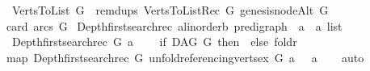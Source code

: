 \begin{isabellebody}
\ \ \ {\isachardoublequoteopen}Verts{\isacharunderscore}{\kern0pt}To{\isacharunderscore}{\kern0pt}List\ G\ {\isacharequal}{\kern0pt}\ remdups\ {\isacharparenleft}{\kern0pt}Verts{\isacharunderscore}{\kern0pt}To{\isacharunderscore}{\kern0pt}List{\isacharunderscore}{\kern0pt}Rec\ G\ {\isacharbrackleft}{\kern0pt}genesis{\isacharunderscore}{\kern0pt}nodeAlt\ G{\isacharbrackright}{\kern0pt}\ \isanewline
\ \ {\isacharparenleft}{\kern0pt}card\ {\isacharparenleft}{\kern0pt}arcs\ G{\isacharparenright}{\kern0pt}{\isacharparenright}{\kern0pt}{\isacharparenright}{\kern0pt}{\isachardoublequoteclose}\isanewline
\isanewline
{}\isamarkupfalse%
\ Depth{\isacharunderscore}{\kern0pt}first{\isacharunderscore}{\kern0pt}search{\isacharunderscore}{\kern0pt}rec{\isacharcolon}{\kern0pt}{\isacharcolon}{\kern0pt}\ {\isachardoublequoteopen}{\isacharparenleft}{\kern0pt}{\isacharprime}{\kern0pt}a{\isacharcolon}{\kern0pt}{\isacharcolon}{\kern0pt}linorder{\isacharcomma}{\kern0pt}{\isacharprime}{\kern0pt}b{\isacharparenright}{\kern0pt}\ pre{\isacharunderscore}{\kern0pt}digraph\ {\isasymRightarrow}\ {\isacharprime}{\kern0pt}a\ {\isasymRightarrow}\ {\isacharprime}{\kern0pt}a\ list{\isachardoublequoteclose}\isanewline
\ \ \ {\isachardoublequoteopen}Depth{\isacharunderscore}{\kern0pt}first{\isacharunderscore}{\kern0pt}search{\isacharunderscore}{\kern0pt}rec\ G\ a\ \ {\isacharequal}{\kern0pt}\ \isanewline
\ {\isacharparenleft}{\kern0pt}if{\isacharparenleft}{\kern0pt}{\isasymnot}\ DAG\ G{\isacharparenright}{\kern0pt}\ then\ {\isacharbrackleft}{\kern0pt}{\isacharbrackright}{\kern0pt}\ else\ {\isacharparenleft}{\kern0pt}foldr\ {\isacharparenleft}{\kern0pt}{\isacharat}{\kern0pt}{\isacharparenright}{\kern0pt}\ \isanewline
\ \ {\isacharparenleft}{\kern0pt}map\ {\isacharparenleft}{\kern0pt}Depth{\isacharunderscore}{\kern0pt}first{\isacharunderscore}{\kern0pt}search{\isacharunderscore}{\kern0pt}rec\ G{\isacharparenright}{\kern0pt}\ {\isacharparenleft}{\kern0pt}unfold{\isacharunderscore}{\kern0pt}referencing{\isacharunderscore}{\kern0pt}verts{\isacharunderscore}{\kern0pt}ex\ G\ a{\isacharparenright}{\kern0pt}{\isacharparenright}{\kern0pt}\ {\isacharbrackleft}{\kern0pt}{\isacharbrackright}{\kern0pt}{\isacharparenright}{\kern0pt}\ {\isacharat}{\kern0pt}\ {\isacharbrackleft}{\kern0pt}a{\isacharbrackright}{\kern0pt}{\isacharparenright}{\kern0pt}{\isachardoublequoteclose}\isanewline
%
\isadelimproof
\ \ %
\endisadelimproof
%
\isatagproof
{}\isamarkupfalse%
\ auto%
\endisatagproof
{\isafoldproof}%
%
\isadelimproof
\isanewline
%
\endisadelimproof

\end{isabellebody}
